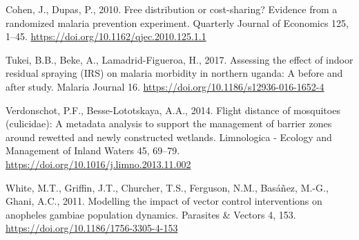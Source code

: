 \documentclass[]{article}
\begin{document}
\hypertarget{ref-Cohen2010}{}
Cohen, J., Dupas, P., 2010. Free distribution or cost-sharing? Evidence
from a randomized malaria prevention experiment. Quarterly Journal of
Economics 125, 1--45. \url{https://doi.org/10.1162/qjec.2010.125.1.1}

\hypertarget{ref-Tukei2017}{}
Tukei, B.B., Beke, A., Lamadrid-Figueroa, H., 2017. Assessing the effect
of indoor residual spraying (IRS) on malaria morbidity in northern
uganda: A before and after study. Malaria Journal 16.
\url{https://doi.org/10.1186/s12936-016-1652-4}

\hypertarget{ref-Verdonschot2014}{}
Verdonschot, P.F., Besse-Lototskaya, A.A., 2014. Flight distance of
mosquitoes (culicidae): A metadata analysis to support the management of
barrier zones around rewetted and newly constructed wetlands.
Limnologica - Ecology and Management of Inland Waters 45, 69--79.
\url{https://doi.org/10.1016/j.limno.2013.11.002}

\hypertarget{ref-White2011}{}
White, M.T., Griffin, J.T., Churcher, T.S., Ferguson, N.M., Basáñez,
M.-G., Ghani, A.C., 2011. Modelling the impact of vector control
interventions on anopheles gambiae population dynamics. Parasites \&
Vectors 4, 153. \url{https://doi.org/10.1186/1756-3305-4-153}
\end{document}
